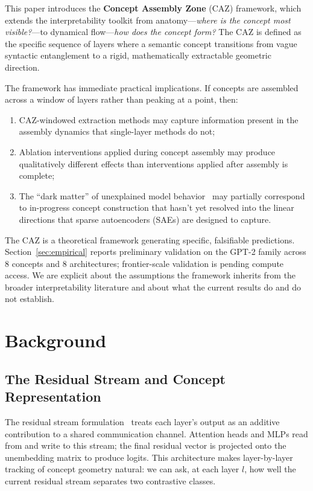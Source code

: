 \documentclass[11pt,a4paper]{article}
\begin{document}
This paper introduces the \textbf{Concept Assembly Zone} (CAZ) framework, which
extends the interpretability toolkit from anatomy---\emph{where is the concept most
	visible?}---to dynamical flow---\emph{how does the concept form?} The CAZ is defined
as the specific sequence of layers where a semantic concept transitions from vague
syntactic entanglement to a rigid, mathematically extractable geometric direction.

The framework has immediate practical implications. If concepts are assembled across
a window of layers rather than peaking at a point, then:
\begin{enumerate}
	\item CAZ-windowed extraction methods may capture information present in the assembly
	      dynamics that single-layer methods do not;
	\item Ablation interventions applied during concept assembly may produce qualitatively
	      different effects than interventions applied after assembly is complete;
	\item The ``dark matter'' of unexplained model behavior~\citep{engels2024dark} may
	      partially correspond to in-progress concept construction that hasn't yet resolved
	      into the linear directions that sparse autoencoders (SAEs) are designed to capture.
\end{enumerate}

The CAZ is a theoretical framework generating specific, falsifiable predictions.
Section~\ref{sec:empirical} reports preliminary validation on the GPT-2 family
across 8 concepts and 8 architectures; frontier-scale validation is pending compute
access. We are explicit about the assumptions the framework inherits from the
broader interpretability literature and about what the current results do and do
not establish.

\section{Background}
\label{sec:background}

\subsection{The Residual Stream and Concept Representation}

The residual stream formulation~\citep{elhage2021mathematical} treats each layer's
output as an additive contribution to a shared communication channel. Attention heads
and MLPs read from and write to this stream; the final residual vector is projected
onto the unembedding matrix to produce logits. This architecture makes layer-by-layer
tracking of concept geometry natural: we can ask, at each layer $l$, how well the
current residual stream separates two contrastive classes.
\end{document}
